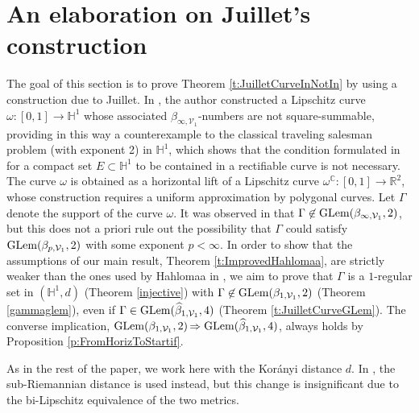 \documentclass[12pt]{amsart}
\newcommand{\R}{\mathbb R}
\renewcommand{\H}{\mathbb H}
\newcommand{\C}{\mathbb C}
\numberwithin{equation}{section}
\theoremstyle{plain}
\theoremstyle{definition}
\theoremstyle{remark}
\begin{document}



\section{An elaboration on Juillet's construction}\label{s:Juillet}
The goal of this section is to prove Theorem \ref{t:JuilletCurveInNotIn} by using a construction due to Juillet.
In \cite{Juillet}, the author constructed a Lipschitz curve $\omega:[0,1]\to\H^1$ whose associated $\beta_{\infty,\mathcal V_1}$-numbers are not square-summable, providing in this way a counterexample to the classical traveling salesman problem (with exponent 2) in $\H^1$, which shows that the condition formulated in \cite{MR2371434} for a compact set $E\subset\H^1$ to be contained in a rectifiable curve is not necessary. The curve $\omega$ is obtained as a horizontal lift of a Lipschitz curve $\omega^\C:[0,1]\to\R^2$, whose construction requires a uniform approximation by polygonal curves. Let $\Gamma$ denote the support of the curve $\omega$. It was observed in \cite[Proposition 4.37]{FV2} that $\Gamma\not\in{\rm GLem}(\beta_{\infty,\mathcal V_1},2)$, but this does not a priori rule out the possibility that $\Gamma$ could satisfy
${\rm GLem}(\beta_{p,\mathcal V_1},2)$
with some exponent $p<\infty$. In order to show that the assumptions of our main result, Theorem \ref{t:ImprovedHahlomaa}, are strictly weaker than the ones used by Hahlomaa in \cite{Hahlomaa}, we aim to prove that $\Gamma$ is a $1$-regular set in $(\H^1, d)$ (Theorem \ref{injective}) with $\Gamma\not\in{\rm GLem}(\beta_{1,\mathcal V_1},2)$ (Theorem \ref{gammaglem}), even if $\Gamma\in {\rm GLem}(\widehat\beta_{1,\mathcal V_1},4)$ (Theorem \ref{t:JuilletCurveGLem}). The converse implication, 
${\rm GLem}(\beta_{1,\mathcal V_1},2){\,\Rightarrow\rm GLem}(\widehat\beta_{1,\mathcal V_1},4)$, 
always holds by Proposition \ref{p:FromHorizToStartif}.



As in the rest of the paper, we work here with the Kor\'{a}nyi distance $d$. In \cite{Juillet}, the sub-Riemannian distance is used instead, but this change is insignificant due to the bi-Lipschitz equivalence of the two metrics. 
\end{document}
